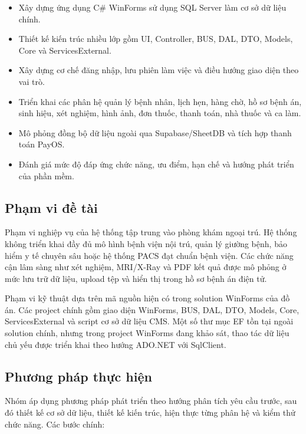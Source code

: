 \documentclass[12pt,a4paper]{article}
\numberwithin{figure}{subsection}
\numberwithin{table}{subsection}
\begin{document}
\begin{itemize}
    \item Xây dựng ứng dụng C\# WinForms sử dụng SQL Server làm cơ sở dữ liệu chính.
    \item Thiết kế kiến trúc nhiều lớp gồm UI, Controller, BUS, DAL, DTO, Models, Core và ServicesExternal.
    \item Xây dựng cơ chế đăng nhập, lưu phiên làm việc và điều hướng giao diện theo vai trò.
    \item Triển khai các phân hệ quản lý bệnh nhân, lịch hẹn, hàng chờ, hồ sơ bệnh án, sinh hiệu, xét nghiệm, hình ảnh, đơn thuốc, thanh toán, nhà thuốc và ca làm.
    \item Mô phỏng đồng bộ dữ liệu ngoài qua Supabase/SheetDB và tích hợp thanh toán PayOS.
    \item Đánh giá mức độ đáp ứng chức năng, ưu điểm, hạn chế và hướng phát triển của phần mềm.
\end{itemize}

\subsection{Phạm vi đề tài}

Phạm vi nghiệp vụ của hệ thống tập trung vào phòng khám ngoại trú. Hệ thống không triển khai đầy đủ mô hình bệnh viện nội trú, quản lý giường bệnh, bảo hiểm y tế chuyên sâu hoặc hệ thống PACS đạt chuẩn bệnh viện. Các chức năng cận lâm sàng như xét nghiệm, MRI/X-Ray và PDF kết quả được mô phỏng ở mức lưu trữ dữ liệu, upload tệp và hiển thị trong hồ sơ bệnh án điện tử.

Phạm vi kỹ thuật dựa trên mã nguồn hiện có trong solution WinForms của đồ án. Các project chính gồm giao diện WinForms, BUS, DAL, DTO, Models, Core, ServicesExternal và script cơ sở dữ liệu CMS. Một số thư mục EF tồn tại ngoài solution chính, nhưng trong project WinForms đang khảo sát, thao tác dữ liệu chủ yếu được triển khai theo hướng ADO.NET với SqlClient.

\subsection{Phương pháp thực hiện}

Nhóm áp dụng phương pháp phát triển theo hướng phân tích yêu cầu trước, sau đó thiết kế cơ sở dữ liệu, thiết kế kiến trúc, hiện thực từng phân hệ và kiểm thử chức năng. Các bước chính:
\end{document}
